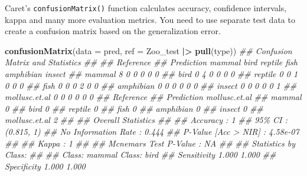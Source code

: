 \documentclass[
  notitlepage]{book}
\newenvironment{Shaded}{\begin{snugshade}}{\end{snugshade}}
\newcommand{\CommentTok}[1]{\textcolor[rgb]{0.56,0.35,0.01}{\textit{#1}}}
\newcommand{\DataTypeTok}[1]{\textcolor[rgb]{0.13,0.29,0.53}{#1}}
\newcommand{\ErrorTok}[1]{\textcolor[rgb]{0.64,0.00,0.00}{\textbf{#1}}}
\newcommand{\KeywordTok}[1]{\textcolor[rgb]{0.13,0.29,0.53}{\textbf{#1}}}
\newcommand{\NormalTok}[1]{#1}
\newcommand{\OperatorTok}[1]{\textcolor[rgb]{0.81,0.36,0.00}{\textbf{#1}}}
\newcommand{\StringTok}[1]{\textcolor[rgb]{0.31,0.60,0.02}{#1}}
\begin{document}
Caret's \texttt{confusionMatrix()} function calculates accuracy, confidence
intervals, kappa and many more evaluation metrics. You need to use
separate test data to create a confusion matrix based on the
generalization error.

\begin{Shaded}
\begin{Highlighting}[]
\KeywordTok{confusionMatrix}\NormalTok{(}\DataTypeTok{data =}\NormalTok{ pred, }
                \DataTypeTok{ref =}\NormalTok{ Zoo\_test }\OperatorTok{|}\ErrorTok{\textgreater{}}\StringTok{ }\KeywordTok{pull}\NormalTok{(type))}
\CommentTok{\#\# Confusion Matrix and Statistics}
\CommentTok{\#\# }
\CommentTok{\#\#                Reference}
\CommentTok{\#\# Prediction      mammal bird reptile fish amphibian insect}
\CommentTok{\#\#   mammal             8    0       0    0         0      0}
\CommentTok{\#\#   bird               0    4       0    0         0      0}
\CommentTok{\#\#   reptile            0    0       1    0         0      0}
\CommentTok{\#\#   fish               0    0       0    2         0      0}
\CommentTok{\#\#   amphibian          0    0       0    0         0      0}
\CommentTok{\#\#   insect             0    0       0    0         0      1}
\CommentTok{\#\#   mollusc.et.al      0    0       0    0         0      0}
\CommentTok{\#\#                Reference}
\CommentTok{\#\# Prediction      mollusc.et.al}
\CommentTok{\#\#   mammal                    0}
\CommentTok{\#\#   bird                      0}
\CommentTok{\#\#   reptile                   0}
\CommentTok{\#\#   fish                      0}
\CommentTok{\#\#   amphibian                 0}
\CommentTok{\#\#   insect                    0}
\CommentTok{\#\#   mollusc.et.al             2}
\CommentTok{\#\# }
\CommentTok{\#\# Overall Statistics}
\CommentTok{\#\#                                     }
\CommentTok{\#\#                Accuracy : 1         }
\CommentTok{\#\#                  95\% CI : (0.815, 1)}
\CommentTok{\#\#     No Information Rate : 0.444     }
\CommentTok{\#\#     P{-}Value [Acc \textgreater{} NIR] : 4.58e{-}07  }
\CommentTok{\#\#                                     }
\CommentTok{\#\#                   Kappa : 1         }
\CommentTok{\#\#                                     }
\CommentTok{\#\#  Mcnemar\textquotesingle{}s Test P{-}Value : NA        }
\CommentTok{\#\# }
\CommentTok{\#\# Statistics by Class:}
\CommentTok{\#\# }
\CommentTok{\#\#                      Class: mammal Class: bird}
\CommentTok{\#\# Sensitivity                  1.000       1.000}
\CommentTok{\#\# Specificity                  1.000       1.000}

\end{Highlighting}
\end{Shaded}
\end{document}
